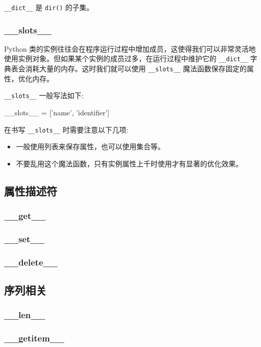 \texttt{\_\_dict\_\_} 是 \texttt{dir()} 的子集。

\subsubsection{\_\_slots\_\_}

Python 类的实例往往会在程序运行过程中增加成员，这使得我们可以非常灵活地使用实例对象。但如果某个实例的成员过多，在运行过程中维护它的 \texttt{\_\_dict\_\_} 字典表会消耗大量的内存。这时我们就可以使用 \texttt{\_\_slots\_\_} 魔法函数保存固定的属性，优化内存。

\texttt{\_\_slots\_\_} 一般写法如下:
\begin{python}
__slots__ = ['name', 'identifier']
\end{python}

在书写 \texttt{\_\_slots\_\_} 时需要注意以下几项:
\begin{itemize}
    \item 一般使用列表来保存属性，也可以使用集合等。
    \item 不要乱用这个魔法函数，只有实例属性上千时使用才有显著的优化效果。
\end{itemize}

\subsection{属性描述符}
\subsubsection{\_\_get\_\_}



\subsubsection{\_\_set\_\_}
\subsubsection{\_\_delete\_\_}

\subsection{序列相关}
\subsubsection{\_\_len\_\_}
\subsubsection{\_\_getitem\_\_}
